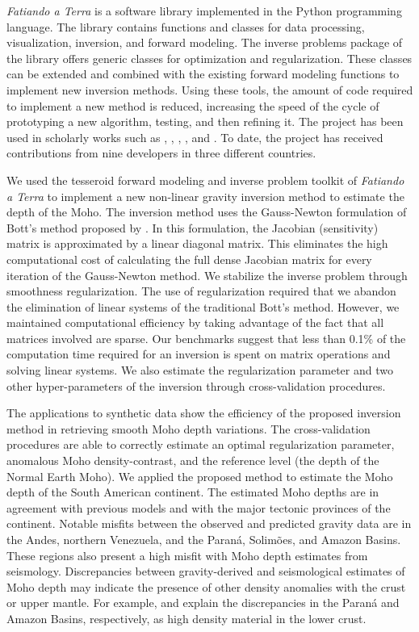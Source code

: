 \textit{Fatiando a Terra} is a software library implemented in the Python
programming language.
The library contains functions and classes for data processing, visualization,
inversion, and forward modeling.
The inverse problems package of the library offers generic classes for
optimization and regularization.
These classes can be extended and combined with the existing forward modeling
functions to implement new inversion methods.
Using these tools, the amount of code required to implement a new method is
reduced, increasing the speed of the cycle of prototyping a new algorithm,
testing, and then refining it.
The project has been used in scholarly works such as
\citet{carlos2014}, \citet{hidalgo-gato2015a}, \citet{niccoli2015},
\citet{oliveirajr.2015}, and \citet{bassett2016}.
To date, the project has received contributions from nine developers in three
different countries.

We used the tesseroid forward modeling and inverse problem toolkit of
\textit{Fatiando a Terra} to implement a new non-linear gravity inversion
method to estimate the depth of the Moho.
The inversion method uses the Gauss-Newton formulation of Bott's method
proposed by \citet{silva2014}.
In this formulation, the Jacobian (sensitivity) matrix is approximated by a
linear diagonal matrix.
This eliminates the high computational cost of calculating the full dense
Jacobian matrix for every iteration of the Gauss-Newton method.
We stabilize the inverse problem through smoothness regularization.
The use of regularization required that we abandon the elimination of linear
systems of the traditional Bott's method.
However, we maintained computational efficiency by taking advantage of the fact
that all matrices involved are sparse.
Our benchmarks suggest that less than 0.1\% of the computation time required
for an inversion is spent on matrix operations and solving linear systems.
We also estimate the regularization parameter and two other hyper-parameters of
the inversion through cross-validation procedures.

The applications to synthetic data show the
efficiency of the proposed inversion method in retrieving smooth Moho depth
variations.
The cross-validation procedures are able to correctly estimate an optimal
regularization parameter, anomalous Moho density-contrast, and the reference
level (the depth of the Normal Earth Moho).
We applied the proposed method to estimate the Moho depth of the South American
continent.
The estimated Moho depths are in agreement with previous models and with the
major tectonic provinces of the continent.
Notable misfits between the observed and predicted gravity data are in the
Andes, northern Venezuela, and the Paraná, Solimões, and Amazon Basins.
These regions also present a high misfit with Moho depth estimates from
seismology.
Discrepancies between gravity-derived and seismological estimates of Moho depth
may indicate the presence of other density anomalies with the crust or upper
mantle.
For example, \citet{mariani2013} and \citet{nunn1988} explain the discrepancies
in the Paraná and Amazon Basins, respectively, as high density material in the
lower crust.

